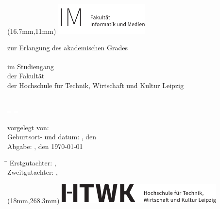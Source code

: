 

\begin{titlepage}
	\noindent
\begin{textblock*}{4.74cm}(16.7mm,11mm)
\includegraphics[width=4.74cm]{Bilder/logos/HTWK-Fakultaetszusatz_IM_schwarz_de-eps-converted-to.pdf}
\end{textblock*}
\begin{center}

\vspace*{0.5cm}

\large
{\textsc{\Large \abschlussarbeit}}

\vspace*{0.5cm}
zur Erlangung des akademischen Grades\\[0.6cm]
\studienganggrad\\[0.6cm]
im Studiengang \studiengang\\
der Fakultät \\
der Hochschule für Technik, Wirtschaft und Kultur Leipzig

{\LARGE \textbf{\titel}}\\
{\LARGE \textbf{-- \subtitel --}}

\end{center}


\vspace*{2cm}
vorgelegt von: \autor \\
Geburtsort- und datum: \geburtsort, den \geburtstag \\
Abgabe: \ort, den \today



\vspace*{1cm}
\large
\begin{tabbing}
\hspace{4cm}\=\kill
Erstgutachter:  \> \erstgutachter, \instituteErstgutachter\\ 
Zweitgutachter: \> \zweitgutachter, \instituteZweitgutachter
\end{tabbing} 

\begin{textblock*}{8.41cm}(18mm,268.3mm)
\includegraphics[width=8.41cm]{Bilder/logos/htwk-logo-eps-converted-to.pdf}
\end{textblock*}

\end{titlepage}
